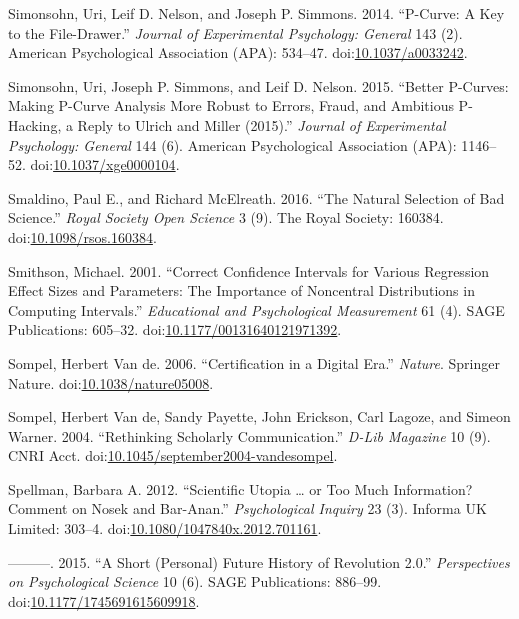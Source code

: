 \documentclass[a5paper]{book}
\begin{document}
\hypertarget{ref-doi:10.1037ux2fa0033242}{}
Simonsohn, Uri, Leif D. Nelson, and Joseph P. Simmons. 2014. ``P-Curve:
A Key to the File-Drawer.'' \emph{Journal of Experimental Psychology:
General} 143 (2). American Psychological Association (APA): 534--47.
doi:\href{https://doi.org/10.1037/a0033242}{10.1037/a0033242}.

\hypertarget{ref-doi:10.1037ux2fxge0000104}{}
Simonsohn, Uri, Joseph P. Simmons, and Leif D. Nelson. 2015. ``Better
P-Curves: Making P-Curve Analysis More Robust to Errors, Fraud, and
Ambitious P-Hacking, a Reply to Ulrich and Miller (2015).''
\emph{Journal of Experimental Psychology: General} 144 (6). American
Psychological Association (APA): 1146--52.
doi:\href{https://doi.org/10.1037/xge0000104}{10.1037/xge0000104}.

\hypertarget{ref-doi:10.1098ux2frsos.160384}{}
Smaldino, Paul E., and Richard McElreath. 2016. ``The Natural Selection
of Bad Science.'' \emph{Royal Society Open Science} 3 (9). The Royal
Society: 160384.
doi:\href{https://doi.org/10.1098/rsos.160384}{10.1098/rsos.160384}.

\hypertarget{ref-doi:10.1177ux2f00131640121971392}{}
Smithson, Michael. 2001. ``Correct Confidence Intervals for Various
Regression Effect Sizes and Parameters: The Importance of Noncentral
Distributions in Computing Intervals.'' \emph{Educational and
Psychological Measurement} 61 (4). SAGE Publications: 605--32.
doi:\href{https://doi.org/10.1177/00131640121971392}{10.1177/00131640121971392}.

\hypertarget{ref-doi:10.1038ux2fnature05008}{}
Sompel, Herbert Van de. 2006. ``Certification in a Digital Era.''
\emph{Nature}. Springer Nature.
doi:\href{https://doi.org/10.1038/nature05008}{10.1038/nature05008}.

\hypertarget{ref-doi:10.1045ux2fseptember2004-vandesompel}{}
Sompel, Herbert Van de, Sandy Payette, John Erickson, Carl Lagoze, and
Simeon Warner. 2004. ``Rethinking Scholarly Communication.'' \emph{D-Lib
Magazine} 10 (9). CNRI Acct.
doi:\href{https://doi.org/10.1045/september2004-vandesompel}{10.1045/september2004-vandesompel}.

\hypertarget{ref-doi:10.1080ux2f1047840X.2012.701161}{}
Spellman, Barbara A. 2012. ``Scientific Utopia \ldots{} or Too Much
Information? Comment on Nosek and Bar-Anan.'' \emph{Psychological
Inquiry} 23 (3). Informa UK Limited: 303--4.
doi:\href{https://doi.org/10.1080/1047840x.2012.701161}{10.1080/1047840x.2012.701161}.

\hypertarget{ref-doi:10.1177ux2f1745691615609918}{}
---------. 2015. ``A Short (Personal) Future History of Revolution
2.0.'' \emph{Perspectives on Psychological Science} 10 (6). SAGE
Publications: 886--99.
doi:\href{https://doi.org/10.1177/1745691615609918}{10.1177/1745691615609918}.
\end{document}
